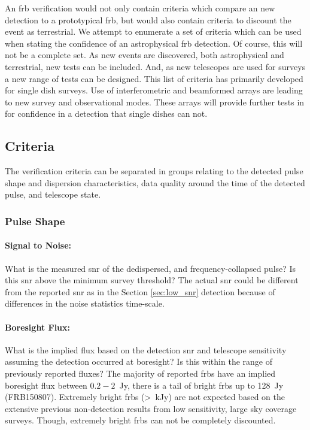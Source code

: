 \documentclass[a4paper,fleqn,usenatbib]{mnras}
\begin{document}
An \gls{frb} verification would not only contain criteria which compare an new
detection to a prototypical \gls{frb}, but would also contain criteria to
discount the event as terrestrial. We attempt to enumerate a set of criteria
which can be used when stating the confidence of an astrophysical \gls{frb}
detection. Of course, this will not be a complete set. As new events are
discovered, both astrophysical and terrestrial, new tests can be included. And,
as new telescopes are used for surveys a new range of tests can be designed.
This list of criteria has primarily developed for single dish surveys.  Use of
interferometric and beamformed arrays are leading to new survey and
observational modes. These arrays will provide further tests in for confidence
in a detection that single dishes can not.

\subsection{Criteria}

The verification criteria can be separated in groups relating to the detected
pulse shape and dispersion characteristics, data quality around the time of the
detected pulse, and telescope state.

\subsubsection{Pulse Shape}

\paragraph{Signal to Noise:}

What is the measured \gls{snr} of the dedispersed, and frequency-collapsed pulse?
Is this \gls{snr} above the minimum survey threshold? The actual \gls{snr} could
be different from the reported \gls{snr} as in the Section \ref{sec:low_snr}
detection because of differences in the noise statistics time-scale.

\paragraph{Boresight Flux:}

What is the implied flux based on the detection \gls{snr} and telescope
sensitivity assuming the detection occurred at boresight? Is this within the
range of previously reported fluxes? The majority of reported \glspl{frb} have
an implied boresight flux between $0.2-2$~Jy, there is a tail of bright
\glspl{frb} up to 128~Jy (FRB150807). Extremely bright \glspl{frb} (>~kJy) are
not expected based on the extensive previous non-detection results from low
sensitivity, large sky coverage surveys. Though, extremely bright \glspl{frb}
can not be completely discounted.
\end{document}
